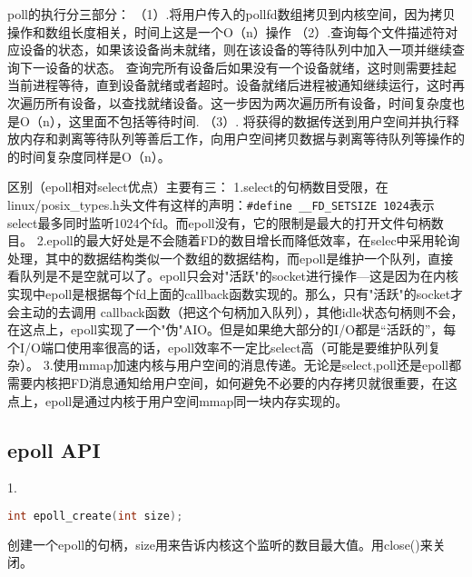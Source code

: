 poll的执行分三部分：
（1）.将用户传入的pollfd数组拷贝到内核空间，因为拷贝操作和数组长度相关，时间上这是一个O（n）操作
（2）.查询每个文件描述符对应设备的状态，如果该设备尚未就绪，则在该设备的等待队列中加入一项并继续查询下一设备的状态。 查询完所有设备后如果没有一个设备就绪，这时则需要挂起当前进程等待，直到设备就绪或者超时。设备就绪后进程被通知继续运行，这时再次遍历所有设备，以查找就绪设备。这一步因为两次遍历所有设备，时间复杂度也是O（n），这里面不包括等待时间.
（3）. 将获得的数据传送到用户空间并执行释放内存和剥离等待队列等善后工作，向用户空间拷贝数据与剥离等待队列等操作的的时间复杂度同样是O（n）。


区别（epoll相对select优点）主要有三：
1.select的句柄数目受限，在linux/posix\_types.h头文件有这样的声明：\verb$#define __FD_SETSIZE 1024$表示select最多同时监听1024个fd。而epoll没有，它的限制是最大的打开文件句柄数目。
2.epoll的最大好处是不会随着FD的数目增长而降低效率，在selec中采用轮询处理，其中的数据结构类似一个数组的数据结构，而epoll是维护一个队列，直接看队列是不是空就可以了。epoll只会对"活跃"的socket进行操作---这是因为在内核实现中epoll是根据每个fd上面的callback函数实现的。那么，只有"活跃"的socket才会主动的去调用 callback函数（把这个句柄加入队列），其他idle状态句柄则不会，在这点上，epoll实现了一个"伪"AIO。但是如果绝大部分的I/O都是“活跃的”，每个I/O端口使用率很高的话，epoll效率不一定比select高（可能是要维护队列复杂）。
3.使用mmap加速内核与用户空间的消息传递。无论是select,poll还是epoll都需要内核把FD消息通知给用户空间，如何避免不必要的内存拷贝就很重要，在这点上，epoll是通过内核于用户空间mmap同一块内存实现的。


\subsection{epoll API}

1.
\begin{lstlisting}[language=C++]
int epoll_create(int size);
\end{lstlisting}

创建一个epoll的句柄，size用来告诉内核这个监听的数目最大值。用close()来关闭。

